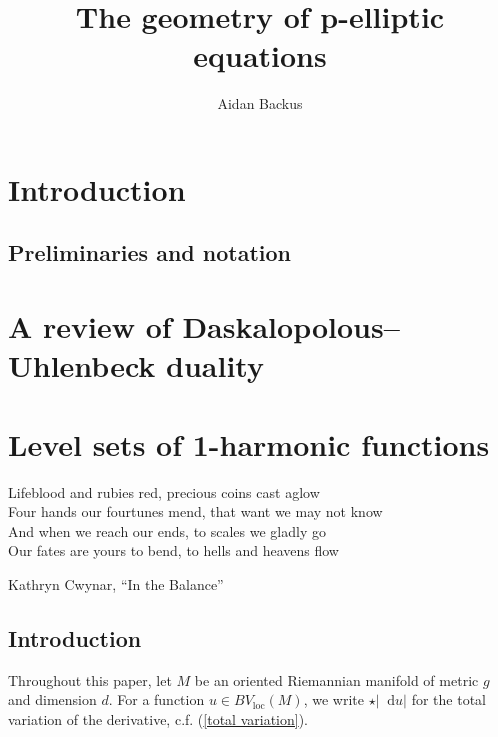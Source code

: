 \documentclass[final,12pt, leqno]{brownthesis}
\newcommand*\dif{\mathop{}\!\mathrm{d}}
\newcommand{\loc}{\mathrm{loc}}
\theoremstyle{definition}
\numberwithin{equation}{section}
\begin{document}
\doublespacing
{} %
\title{\huge \textbf{The geometry of p-elliptic equations}}
\author{Aidan Backus}
\degrees{
	} 
	
 \reader{}
\reader{}

     \beforepreface

\newpage




\tableofcontents
\listoffigures
\afterpreface
\doublespacing





\pagestyle{myheadings}


 
 
 
\chapter{Introduction}

\section{Preliminaries and notation}

\chapter{A review of Daskalopolous--Uhlenbeck duality}


\chapter{Level sets of 1-harmonic functions}
\epigraph{Lifeblood and rubies red, precious coins cast aglow \\ 
Four hands our fourtunes mend, that want we may not know \\
And when we reach our ends, to scales we gladly go \\
Our fates are yours to bend, to hells and heavens flow
}{Kathryn Cwynar, ``In the Balance''}
\section{Introduction}
Throughout this paper, let $M$ be an oriented Riemannian manifold of metric $g$ and dimension $d$.
For a function $u \in BV_\loc(M)$, we write $\star |\dif u|$ for the total variation of the derivative, c.f. (\ref{total variation}).
\end{document}
